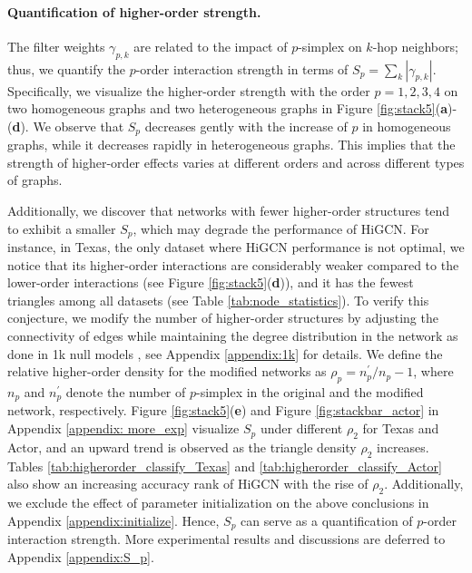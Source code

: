 \documentclass[letterpaper]{article} \usepackage{aaai24}
\theoremstyle{plain}
\theoremstyle{definition}
\theoremstyle{remark}
\begin{document}
\paragraph{Quantification of higher-order strength.}
The filter weights $\gamma_{p,k}$ are related to the impact of $p$-simplex on $k$-hop neighbors; thus, we quantify the $p$-order interaction strength in terms of $ S_p = \sum_k |\gamma_{p,k}|$.
Specifically, we visualize the higher-order strength with the order $p=1,2,3,4$ on two homogeneous graphs and two heterogeneous graphs in Figure \ref{fig:stack5}(\textbf{a})-(\textbf{d}).
We observe that $S_p$ decreases gently with the increase of $p$ in homogeneous graphs, while it decreases rapidly in heterogeneous graphs. 
This implies that the strength of higher-order effects varies at different orders and across different types of graphs. 


Additionally, we discover that networks with fewer higher-order structures tend to exhibit a smaller $S_p$, which may degrade the performance of HiGCN.
For instance, in Texas, the only dataset where HiGCN performance is not optimal, we notice that its higher-order interactions are considerably weaker compared to the lower-order interactions (see Figure \ref{fig:stack5}(\textbf{d})), and it has the fewest triangles among all datasets (see Table \ref{tab:node_statistics}).
To verify this conjecture, we modify the number of higher-order structures by adjusting the connectivity of edges while maintaining the degree distribution in the network as done in 1k null models \cite{nullmodel}, see Appendix \ref{appendix:1k} for details. 
We define the relative higher-order density for the modified networks as
$\rho_p = {n_p^\prime}/{n_p}-1$,
where $n_p$ and $n_p^\prime$ denote the number of $p$-simplex in the original and the modified network, respectively.
Figure \ref{fig:stack5}(\textbf{e}) and Figure \ref{fig:stackbar_actor} in Appendix \ref{appendix: more_exp} visualize $S_p$ under different $\rho_2$ for Texas and Actor, and an upward trend is observed as the triangle density $\rho_2$ increases.
Tables \ref{tab:higherorder_classify_Texas} and \ref{tab:higherorder_classify_Actor} also show an increasing accuracy rank of HiGCN with the rise of $\rho_2$.
Additionally, we exclude the effect of parameter initialization on the above conclusions in Appendix \ref{appendix:initialize}.
Hence, $S_p$ can serve as a  quantification of $p$-order interaction strength. More experimental results and discussions are deferred to Appendix \ref{appendix:S_p}.
\end{document}

